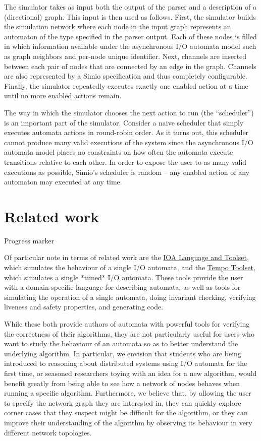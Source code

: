 \documentclass{scrartcl}
\begin{document}
The simulator takes as input both the output of the parser and a description of
a (directional) graph.
This input is then used as follows.
First, the simulator builds the simulation network where each node in the input
graph represents an automaton of the type specified in the parser output.
Each of these nodes is filled in which information available under the
asynchronous I/O automata model such as graph neighbors and per-node unique
identifier.
Next, channels are inserted between each pair of nodes that are connected by an
edge in the graph.
Channels are also represented by a Simio specification and thus completely
configurable.
Finally, the simulator repeatedly executes exactly one enabled action at a time
until no more enabled actions remain.

The way in which the simulator chooses the next action to run (the
``scheduler'') is an important part of the simulator.
Consider a naive scheduler that simply executes automata actions in round-robin
order.
As it turns out, this scheduler cannot produce many valid executions of the
system since the asynchronous I/O automata model places no constraints on how
often the automata execute transitions relative to each other.
In order to expose the user to as many valid executions as possible, Simio's
scheduler is random -- any enabled action of any automaton may executed at any
time.

\section{Related work}

{\color{red}Progress marker}

Of particular note in terms of related work are the
\href{http://groups.csail.mit.edu/tds/ioa/}{IOA Language and Toolset}, which
simulates the behaviour of a single I/O automata, and the
\href{http://www.veromodo.com/}{Tempo Toolset}, which simulates a single
*timed* I/O automata. These tools provide the user with a domain-specific
language for describing automata, as well as tools for simulating the operation
of a single automata, doing invariant checking, verifying liveness and safety
properties, and generating code.

While these both provide authors of automata with powerful tools for verifying
the correctness of their algorithms, they are not particularly useful for
users who want to study the behaviour of an automata so as to better understand
the underlying algorithm. In particular, we envision that students who are
being introduced to reasoning about distributed systems using I/O automata for
the first time, or seasoned researchers toying with an idea for a new
algorithm, would benefit greatly from being able to see how a network of nodes
behaves when running a specific algorithm. Furthermore, we believe that, by
allowing the user to specify the network graph they are interested in, they can
quickly explore corner cases that they suspect might be difficult for the
algorithm, or they can improve their understanding of the algorithm by
observing its behaviour in very different network topologies.
\end{document}
